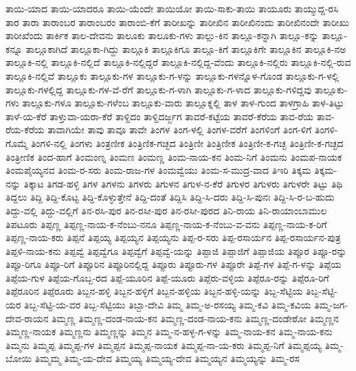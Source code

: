 ತಾಯಿ-ಯಾದ
ತಾಯಿ-ಯಾದರೂ
ತಾಯಿ-ಯೆಂದೇ
ತಾಯಿಯೋ
ತಾಯಿ-ಸಾಕು-ತಾಯಿ
ತಾಯೂರು
ತಾಯ್ಮುದ್ದ-ರಸಿ
ತಾರ
ತಾರಾ
ತಾರಾಂಬರ
ತಾರಾಂಬರಂ
ತಾರಾಂಬಿ-ಕೆಗೆ
ತಾರೀಖನ್ನು
ತಾರೀಖಿನ
ತಾರೀಖಿನಂದು
ತಾರೀಖಿನಂದೇ
ತಾರೀಖು
ತಾರೀಖೆಂದು
ತಾರ್ಕಿಕ
ತಾಲ-ದೇವನು
ತಾಲೂಕು
ತಾಲೂಕು-ಗಳು
ತಾಲ್ಲು-ಕಿನ
ತಾಲ್ಲೂ-ಕನ್ನಾಗಿ
ತಾಲ್ಲೂ-ಕನ್ನು
ತಾಲ್ಲೂ-ಕನ್ನೂ
ತಾಲ್ಲೂಕಾಗಿದೆ
ತಾಲ್ಲೂಕಾ-ಗಿದ್ದು
ತಾಲ್ಲೂಕಿ
ತಾಲ್ಲೂಕಿಗೂ
ತಾಲ್ಲೂ-ಕಿಗೆ
ತಾಲ್ಲೂಕಿಗೇ
ತಾಲ್ಲೂಕಿನ
ತಾಲ್ಲೂಕಿ-ನಅ
ತಾಲ್ಲೂಕಿ-ನಲ್ಲಿ
ತಾಲ್ಲೂಕಿ-ನಲ್ಲಿದೆ
ತಾಲ್ಲೂಕಿ-ನಲ್ಲಿದ್ದರೆ
ತಾಲ್ಲೂಕಿ-ನಲ್ಲಿದ್ದ-ವೆಂದು
ತಾಲ್ಲೂಕಿ-ನಲ್ಲಿರು
ತಾಲ್ಲೂಕಿ-ನಲ್ಲಿ-ರುವ
ತಾಲ್ಲೂಕಿ-ನಲ್ಲಿವೆ
ತಾಲ್ಲೂಕು
ತಾಲ್ಲೂಕು-ಗಳ
ತಾಲ್ಲೂಕು-ಗ-ಳನ್ನು
ತಾಲ್ಲೂಕು-ಗಳನ್ನೊಳ-ಗೊಂಡ
ತಾಲ್ಲೂಕು-ಗ-ಳಲ್ಲಿ
ತಾಲ್ಲೂಕು-ಗಳಲ್ಲಿದ್ದ
ತಾಲ್ಲೂಕು-ಗಳ-ವೆ-ರೆಗೆ
ತಾಲ್ಲೂಕು-ಗ-ಳಾಗಿ
ತಾಲ್ಲೂಕು-ಗ-ಳಾದ
ತಾಲ್ಲೂಕು-ಗಳಿದ್ದವು
ತಾಲ್ಲೂಕು-ಗಳು
ತಾಲ್ಲೂಕು-ಗಳೂ
ತಾಲ್ಲೂಕು-ಗಳೆಂಬ
ತಾಲ್ಲೂಕು-ವಾರು
ತಾಲ್ಲೂಕ್ನಲ್ಲಿ
ತಾಳ
ತಾಳ-ಗುಂದ
ತಾಳಗ್ರಾಹಿ
ತಾಳ-ತಿಟ್ಟು
ತಾಳೆ-ಯ-ಕೆರೆ
ತಾಳ್ತುವಾ-ಯರಾ-ಕೆರೆ
ತಾಳ್ದಿದಂ
ತಾಳ್ದಿದರ್ಜ್ಜಗ
ತಾವರೆ-ಕಟ್ಟೆಯ
ತಾವರೆ-ಕೆರೆಯ
ತಾವ-ರೆಯ
ತಾವ-ರೆಯ-ಕೆರೆಯ
ತಾವಾಗಿಯೇ
ತಾವು
ತಾವೂ
ತಾವೇ
ತಿಂಗಳ
ತಿಂಗ-ಳಲ್ಲಿ
ತಿಂಗಳ-ವರೆಗೆ
ತಿಂಗಳಿಂಗೆ
ತಿಂಗ-ಳಿಗೆ
ತಿಂಗಳಿ-ಗೊಮ್ಮೆ
ತಿಂಗಳಿ-ನಲ್ಲಿ
ತಿಂಗಳು
ತಿಂತ್ರಣೀಕ
ತಿಂತ್ರಿಣಿಕ-ಗಚ್ಛದ
ತಿಂತ್ರಿಣೀ
ತಿಂತ್ರಿಣೀಕ
ತಿಂತ್ರಿಣೀ-ಕ-ಗಚ್ಛ
ತಿಂತ್ರಿಣೀ-ಕ-ಗಚ್ಛದ
ತಿಂತ್ರೀಣಿಕ
ತಿಂದ-ಹಾಗೆ
ತಿಂಮಂಣ್ನ
ತಿಂಮಣ
ತಿಂಮಣ್ಣ
ತಿಂಮ-ನಾಯ-ಕನ
ತಿಂಮ-ನಿಗೆ
ತಿಂಮನು
ತಿಂಮಪ-ನಾಯಕ
ತಿಂಮಪೈಯ್ಯನವ
ತಿಂಮ-ರ-ಸರು
ತಿಂಮ-ರಾಜ-ಗಳ
ತಿಂಮವ್ವೆಯು
ತಿಂಮ-ಸ-ಮುದ್ರ-ವಾದ
ತಿಇರಿ
ತಿಕ್ಕಮ
ತಿಕ್ಕಮ-ನನ್ನು
ತಿಕ್ಕಾಟ
ತಿಗಡ-ಹಳ್ಳಿ
ತಿಗಳ
ತಿಗಳನು
ತಿಗಳರು
ತಿಗುಳನ
ತಿಗುಳ-ನ-ಕೆರೆ
ತಿಗುಳರ
ತಿಗುಳರು
ತಿಗುಳರೇ
ತಿಟ್ಟು
ತಿಥಿ
ತಿದ್ದಲು
ತಿದ್ದಿ
ತಿದ್ದಿ-ಕೊಟ್ಟ
ತಿದ್ದಿ-ಕೊಳ್ಳುತ್ತೇನೆ
ತಿದ್ದಿ-ದಂತೆ
ತಿದ್ದಿಸಿ
ತಿದ್ದಿ-ಸಿ-ದರು
ತಿದ್ದಿ-ಸಿ-ಪುನಃ
ತಿದ್ದಿ-ಸಿ-ರ-ಬ-ಹುದು
ತಿದ್ದು-ವಲ್ಲಿ
ತಿದ್ದು-ವಲ್ಲಿಗೆ
ತಿನ-ರಸಿ-ಪುರ
ತಿನ-ರಸೀ-ಪುರ
ತಿನ-ರಸೀ-ಪುರದ
ತಿನಿ-ರಾಯ
ತಿನಿ-ರಾಯಾಂಬಾಮುಲ
ತಿಪಟೂರು
ತಿಪ್ಪಣ್ಣ
ತಿಪ್ಪಣ್ಣ-ನಾಯ-ಕ-ನೆಂಬು-ನನೂ
ತಿಪ್ಪಣ್ಣ-ನಾಯ-ಕ-ನೆಂಬು-ವ-ವನು
ತಿಪ್ಪಣ್ಣ-ನಾಯ-ಕ-ರಿಗೆ
ತಿಪ್ಪಣ್ಣ-ನಾಯ-ಕರು
ತಿಪ್ಪನೆ
ತಿಪ್ಪಯ್ಯ
ತಿಪ್ಪಯ್ಯನ
ತಿಪ್ಪಯ್ಯನು
ತಿಪ್ಪ-ರ-ಸರು
ತಿಪ್ಪ-ರಸಾರ್ಯನ
ತಿಪ್ಪ-ರಸಾರ್ಯನ-ಪುತ್ರ
ತಿಪ್ಪಳಿ-ನಾಯ-ಕನು
ತಿಪ್ಪವ್ವೆ
ತಿಪ್ಪವ್ವೆಗೂ
ತಿಪ್ಪವ್ವೆಗೆ
ತಿಪ್ಪವ್ವೆ-ಯನ್ನು
ತಿಪ್ಪಾಜಿ
ತಿಪ್ಪಾಜಿಗೆ
ತಿಪ್ಪಾಜಿಯ
ತಿಪ್ಪೂರ
ತಿಪ್ಪೂ-ರನ್ನು
ತಿಪ್ಪೂ-ರಿಗೂ
ತಿಪ್ಪೂ-ರಿಗೆ
ತಿಪ್ಪೂರಿನ
ತಿಪ್ಪೂರಿನಲ್ಲಿದ್ದ
ತಿಪ್ಪೂರು
ತಿಪ್ಪೂರು-ಗಳ
ತಿಪ್ಪೂರೇ
ತಿಪ್ಪೆ-ಗಳ
ತಿಪ್ಪೆ-ಗ-ಳನ್ನು
ತಿಪ್ಪೆಯ
ತಿಪ್ಪೆಯ-ಗುಳ
ತಿಪ್ಪೆಯ-ಗೊಬ್ಬ-ರದ
ತಿಪ್ಪೆ-ಯೂರಿನ
ತಿಪ್ಪೆ-ಯೂರು
ತಿಪ್ಪೆರು-ವಳ್ಳಿಯ
ತಿಪ್ಪೆರೂ-ರನ್ನು
ತಿಪ್ಪೆರೂ-ರಿಗೆ
ತಿಪ್ಪೆರೂರಿನ
ತಿಪ್ಪೆರೂರು
ತಿಬ್ಬನ-ಹಳ್ಳಿ
ತಿಬ್ಬನ-ಹಳ್ಳಿಗೆ
ತಿಬ್ಬನ-ಹಳ್ಳಿಯ
ತಿಬ್ಬನ-ಹಳ್ಳಿ-ಯನ್ನು
ತಿಬ್ಬ-ಸೆಟ್ಟಿಯ
ತಿಬ್ಬ-ಸೆಟ್ಟಿ-ಯರ
ತಿಬ್ಬ-ಸೆಟ್ಟಿ-ಯ-ವರ
ತಿಬ್ಬ-ಸೆಟ್ಟಿಯು
ತಿಬ್ಬಾ-ದೇವಿ
ತಿಮ್ಮ
ತಿಮ್ಮ-ಅ-ರಸಯ್ಯ
ತಿಮ್ಮ-ಕವಿ
ತಿಮ್ಮ-ಕವಿಯ
ತಿಮ್ಮ-ಜಗ-ದೇವ-ರಾಯನ
ತಿಮ್ಮಣ್ಣ
ತಿಮ್ಮಣ್ಣ-ದಂಡ-ನಾಯ-ಕನ
ತಿಮ್ಮಣ್ಣ-ದಂಡ-ನಾಯ-ಕನು
ತಿಮ್ಮಣ್ಣ-ದಂಡೇಠೋ
ತಿಮ್ಮಣ್ಣನ
ತಿಮ್ಮಣ್ಣ-ನಾಯಕ
ತಿಮ್ಮಣ್ಣನು
ತಿಮ್ಮಣ್ಣನ್ನು
ತಿಮ್ಮನ
ತಿಮ್ಮ-ನ-ಹಳ್ಳ-ಗ-ಳನ್ನು
ತಿಮ್ಮ-ನಾಯ-ಕನ
ತಿಮ್ಮ-ನಾಯ-ಕನು
ತಿಮ್ಮನು
ತಿಮ್ಮಪ್ಪ
ತಿಮ್ಮಪ್ಪ-ಗಳ
ತಿಮ್ಮಪ್ಪನ
ತಿಮ್ಮಪ್ಪ-ನಾಯಕ
ತಿಮ್ಮಪ್ಪ-ನಾ-ಯ-ಕರು
ತಿಮ್ಮಪ್ಪ-ನಿಗೆ
ತಿಮ್ಮಪ್ಪಯ್ಯ
ತಿಮ್ಮ-ಬೋಯಿ
ತಿಮ್ಮಮ್ಮ
ತಿಮ್ಮ-ಯ-ದೇವ
ತಿಮ್ಮಯ್ಯ
ತಿಮ್ಮಯ್ಯ-ದೇವ
ತಿಮ್ಮಯ್ಯನ
ತಿಮ್ಮಯ್ಯನ್ನು
ತಿಮ್ಮ-ರಸ
